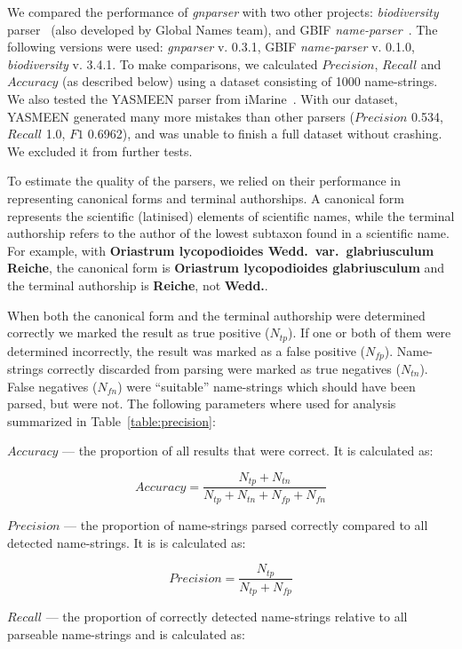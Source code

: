 \documentclass{bmcart}
\begin{document}
We compared the performance of \textit{gnparser} with two other projects: \textit{biodiversity} parser~\cite{Boyle2013, biodiversity} (also developed by Global Names team), and GBIF \textit{name-parser}~\cite{gbifNameParser}. The following versions were used: \textit{gnparser} v.  0.3.1, GBIF \textit{name-parser} v. 0.1.0, \textit{biodiversity} v. 3.4.1. To make comparisons, we calculated $Precision$, $Recall$ and $Accuracy$ (as described below) using a dataset consisting of 1000 name-strings. We also tested the YASMEEN parser from iMarine~\cite{VandenBerghe2015}. With our dataset, YASMEEN generated many more mistakes than other parsers ($Precision$ 0.534, $Recall$ 1.0, $F1$ 0.6962), and was unable to finish a full dataset without crashing. We excluded it from further tests.

To estimate the quality of the parsers, we relied on their performance in representing canonical forms and terminal authorships. A canonical form represents the scientific (latinised) elements of scientific names, while the terminal authorship refers to the author of the lowest subtaxon found in a scientific name. For example, with \textbf{Oriastrum lycopodioides Wedd.\ var.\ glabriusculum Reiche}, the canonical form is \textbf{Oriastrum lycopodioides glabriusculum} and the terminal authorship is \textbf{Reiche}, not \textbf{Wedd.}.

When both the canonical form and the terminal authorship were determined correctly we marked the result as true positive ($N_{tp}$). If one or both of them were determined incorrectly, the result was marked as a false positive ($N_{fp}$). Name-strings correctly discarded from parsing were marked as true negatives ($N_{tn}$). False negatives ($N_{fn}$) were ``suitable'' name-strings which should have been parsed, but were not. The following parameters where used for analysis summarized in Table~\ref{table:precision}:

$Accuracy$ --- the proportion of all results that were correct. It is calculated as:

\[Accuracy = \dfrac{N_{tp} + N_{tn}}{N_{tp} + N_{tn} + N_{fp} + N_{fn}}\]

$Precision$ --- the proportion of name-strings parsed correctly compared to all detected name-strings. It is is calculated as:

\[Precision = \dfrac{N_{tp}}{N_{tp} + N_{fp}}\]

$Recall$ --- the proportion of correctly detected name-strings relative to all parseable name-strings and is calculated as:
\end{document}
